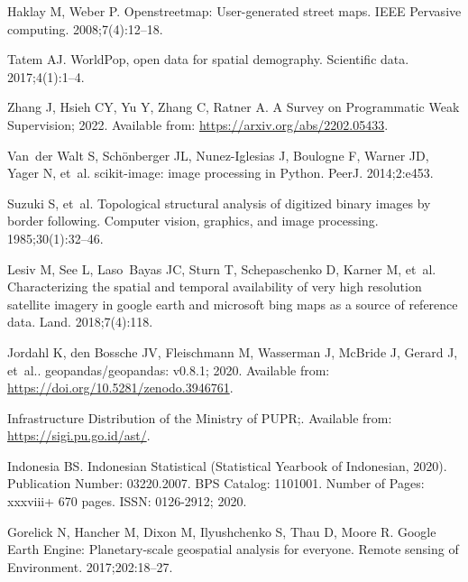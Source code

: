 \documentclass[10pt,letterpaper]{article}
\begin{document}
\begin{thebibliography}{10}
Haklay M, Weber P.
\newblock Openstreetmap: User-generated street maps.
\newblock IEEE Pervasive computing. 2008;7(4):12--18.

Tatem AJ.
\newblock WorldPop, open data for spatial demography.
\newblock Scientific data. 2017;4(1):1--4.

Zhang J, Hsieh CY, Yu Y, Zhang C, Ratner A. A Survey on Programmatic Weak
  Supervision; 2022.
\newblock Available from: \url{https://arxiv.org/abs/2202.05433}.

Van~der Walt S, Sch{\"o}nberger JL, Nunez-Iglesias J, Boulogne F, Warner JD,
  Yager N, et~al.
\newblock scikit-image: image processing in Python.
\newblock PeerJ. 2014;2:e453.

Suzuki S, et~al.
\newblock Topological structural analysis of digitized binary images by border
  following.
\newblock Computer vision, graphics, and image processing. 1985;30(1):32--46.

Lesiv M, See L, Laso~Bayas JC, Sturn T, Schepaschenko D, Karner M, et~al.
\newblock Characterizing the spatial and temporal availability of very high
  resolution satellite imagery in google earth and microsoft bing maps as a
  source of reference data.
\newblock Land. 2018;7(4):118.

Jordahl K, den Bossche JV, Fleischmann M, Wasserman J, McBride J, Gerard J,
  et~al.. geopandas/geopandas: v0.8.1; 2020.
\newblock Available from: \url{https://doi.org/10.5281/zenodo.3946761}.

Infrastructure Distribution of the Ministry of PUPR;.
\newblock Available from: \url{https://sigi.pu.go.id/ast/}.

Indonesia BS. Indonesian Statistical (Statistical Yearbook of Indonesian,
  2020). Publication Number: 03220.2007. BPS Catalog: 1101001. Number of Pages:
  xxxviii+ 670 pages. ISSN: 0126-2912; 2020.

Gorelick N, Hancher M, Dixon M, Ilyushchenko S, Thau D, Moore R.
\newblock Google Earth Engine: Planetary-scale geospatial analysis for
  everyone.
\newblock Remote sensing of Environment. 2017;202:18--27.

\end{thebibliography}
\end{document}
